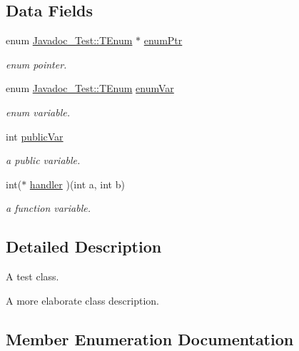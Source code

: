 \subsection*{Data Fields}
\begin{DoxyCompactItemize}
\item 
enum \mbox{\hyperlink{class_javadoc___test_a33e3643b66dfa91e4fb7cc663a23e166}{Javadoc\+\_\+\+Test\+::\+T\+Enum}} $\ast$ \mbox{\hyperlink{class_javadoc___test_ab994283d87e01a8bbe197a9c8eac7c06}{enum\+Ptr}}
\begin{DoxyCompactList}\small\item\em enum pointer. \end{DoxyCompactList}\item 
enum \mbox{\hyperlink{class_javadoc___test_a33e3643b66dfa91e4fb7cc663a23e166}{Javadoc\+\_\+\+Test\+::\+T\+Enum}} \mbox{\hyperlink{class_javadoc___test_a1e1e81400c78c4a5992888bd484d9d68}{enum\+Var}}
\begin{DoxyCompactList}\small\item\em enum variable. \end{DoxyCompactList}\item 
int \mbox{\hyperlink{class_javadoc___test_a292887ac25652b1d8448430f583378c3}{public\+Var}}
\begin{DoxyCompactList}\small\item\em a public variable. \end{DoxyCompactList}\item 
int($\ast$ \mbox{\hyperlink{class_javadoc___test_a83e6d7b763dc413e96b0c435a1d29a5d}{handler}} )(int a, int b)
\begin{DoxyCompactList}\small\item\em a function variable. \end{DoxyCompactList}\end{DoxyCompactItemize}


\subsection{Detailed Description}
A test class. 

A more elaborate class description. 

\subsection{Member Enumeration Documentation}
\mbox{\label{class_javadoc___test_a33e3643b66dfa91e4fb7cc663a23e166}} 
